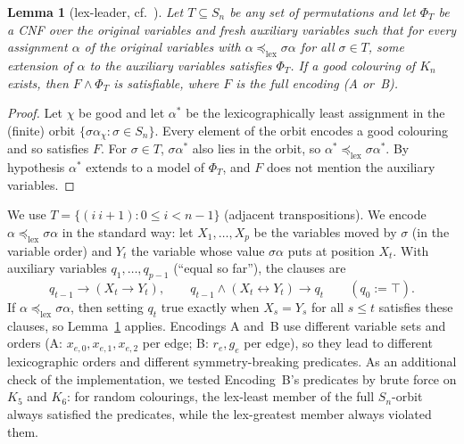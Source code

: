\documentclass[11pt]{amsart}
\newtheorem{lemma}[theorem]{Lemma}
\theoremstyle{definition}
\theoremstyle{remark}
\newcommand{\lexle}{\preceq_{\mathrm{lex}}}
\begin{document}
\begin{lemma}[lex-leader, cf.~\cite{CGLR}]\label{lem:lexleader}
Let $T\subseteq S_n$ be any set of permutations and let $\Phi_T$ be a CNF over the original variables and fresh auxiliary variables such
that for every assignment $\alpha$ of the original variables with $\alpha\lexle\sigma\alpha$ for all $\sigma\in T$, some extension of
$\alpha$ to the auxiliary variables satisfies $\Phi_T$. If a good colouring of $K_n$ exists, then $F\wedge\Phi_T$ is satisfiable,
where $F$ is the full encoding (A or~B).
\end{lemma}
\begin{proof}
Let $\chi$ be good and let $\alpha^*$ be the lexicographically least assignment in the (finite) orbit $\{\sigma\alpha_\chi:\sigma\in
S_n\}$. Every element of the orbit encodes a good colouring and so satisfies $F$. For $\sigma\in T$, $\sigma\alpha^*$ also lies in the orbit, so
$\alpha^*\lexle\sigma\alpha^*$. By hypothesis $\alpha^*$ extends to a model of $\Phi_T$, and $F$ does not mention the auxiliary variables.
\end{proof}

We use $T=\{(i\ i{+}1):0\le i<n-1\}$ (adjacent transpositions). We encode $\alpha\lexle\sigma\alpha$ in the standard way: let
$X_1,\dots,X_p$ be the variables moved by $\sigma$ (in the variable order) and $Y_t$ the variable whose value $\sigma\alpha$ puts at
position $X_t$. With auxiliary variables $q_1,\dots,q_{p-1}$ (``equal so far''), the clauses are
\[
q_{t-1}\rightarrow(X_t\rightarrow Y_t),\qquad q_{t-1}\wedge(X_t\leftrightarrow Y_t)\rightarrow q_t\qquad(q_0:=\top).
\]
If $\alpha\lexle\sigma\alpha$, then setting $q_t$ true exactly when $X_s=Y_s$ for all $s\le t$ satisfies these clauses, so
Lemma~\ref{lem:lexleader} applies. Encodings A and~B use different variable sets and orders (A: $x_{e,0},x_{e,1},x_{e,2}$ per edge;
B: $r_e,g_e$ per edge), so they lead to different lexicographic orders and different symmetry-breaking predicates. As an additional
check of the implementation, we tested Encoding~B's predicates by brute force on $K_5$ and $K_6$: for random colourings, the
lex-least member of the full $S_n$-orbit always satisfied the predicates, while the lex-greatest member always violated them.
\end{document}
